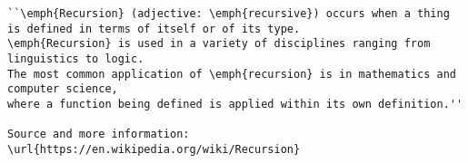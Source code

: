 \begin{verbatim}
``\emph{Recursion} (adjective: \emph{recursive}) occurs when a thing is defined in terms of itself or of its type.
\emph{Recursion} is used in a variety of disciplines ranging from linguistics to logic.
The most common application of \emph{recursion} is in mathematics and computer science,
where a function being defined is applied within its own definition.''

Source and more information: \url{https://en.wikipedia.org/wiki/Recursion}
\end{verbatim}
